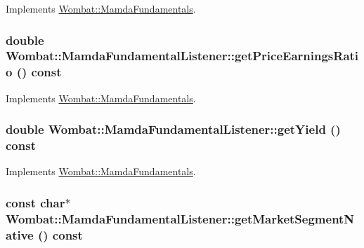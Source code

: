 Implements \hyperlink{classWombat_1_1MamdaFundamentals_e5719741fcc970ea66688ed60f6541ad}{Wombat::Mamda\-Fundamentals}.\hypertarget{classWombat_1_1MamdaFundamentalListener_c075de507dd9561ed9af165d56674410}{
\subsubsection[getPriceEarningsRatio]{\setlength{\rightskip}{0pt plus 5cm}double Wombat::Mamda\-Fundamental\-Listener::get\-Price\-Earnings\-Ratio () const}}
\label{classWombat_1_1MamdaFundamentalListener_c075de507dd9561ed9af165d56674410}




Implements \hyperlink{classWombat_1_1MamdaFundamentals_1072c58f01ad734655f34332bc9e8055}{Wombat::Mamda\-Fundamentals}.\hypertarget{classWombat_1_1MamdaFundamentalListener_89cfb3cdee2c8597e1684e71c69fc50a}{
\subsubsection[getYield]{\setlength{\rightskip}{0pt plus 5cm}double Wombat::Mamda\-Fundamental\-Listener::get\-Yield () const}}
\label{classWombat_1_1MamdaFundamentalListener_89cfb3cdee2c8597e1684e71c69fc50a}




Implements \hyperlink{classWombat_1_1MamdaFundamentals_3d9a05c2c0adbb5acaf08d4bc1cce29c}{Wombat::Mamda\-Fundamentals}.\hypertarget{classWombat_1_1MamdaFundamentalListener_579d342071f318ca31a7fc55e11f9ea3}{
\subsubsection[getMarketSegmentNative]{\setlength{\rightskip}{0pt plus 5cm}const char$\ast$ Wombat::Mamda\-Fundamental\-Listener::get\-Market\-Segment\-Native () const}}
\label{classWombat_1_1MamdaFundamentalListener_579d342071f318ca31a7fc55e11f9ea3}




